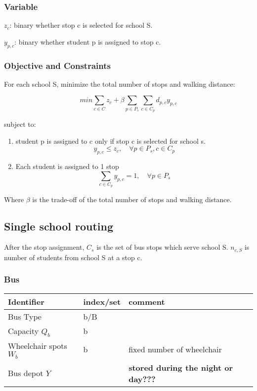 \documentclass[11pt]{article}
\begin{document}
\subsubsection{Variable}
\label{sec:org6ed95a1}
\(z_c\): binary whether stop c is selected for school S.

\(y_{p,c}\): binary whether student p is assigned to stop c. 

\subsubsection{Objective and Constraints}
\label{sec:org02ad4fa}
For each school S, minimize the total number of stops and walking distance:

$$ min \sum_{c \in C} z_c + \beta \sum_{p \in P_s} \sum_{c \in C_p} d_{p,c} y_{p,c}$$

subject to:

\begin{enumerate}
\item student p is assigned to c only if stop c is selected for school s.
$$y_{p,c} \leq z_c,\quad  \forall p \in P_s , c \in C_p$$

\item Each student is assigned to 1 stop
$$\sum_{c \in C_p} y_{p,c} = 1 ,\quad \forall p \in P_s $$
\end{enumerate}

Where \(\beta\) is the trade-off of the total number of stops and walking
distance.

\subsection{Single school routing}
\label{sec:orgd7e2d6f}
After the stop assignment, \(C_s\) is the set of bus stops which serve
school S.
\(n_{c,S}\) is number of students from school S at a stop c.

\subsubsection{Bus}
\label{sec:orgb141c6a}
\begin{center}
\begin{tabular}{lll}
Identifier & index/set & comment\\
\hline
Bus Type & b/B & \\
Capacity \(Q_b\) & b & \\
Wheelchair spots \(W_b\) & b & fixed number of wheelchair\\
Bus depot \(Y\) &  & \textbf{stored during the night or day???}\\
\end{tabular}
\end{center}
\end{document}
